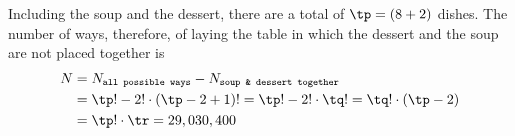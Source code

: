 
\watchout

\ifprintanswers
\fi 

\begin{solution}[\mcq]
  Including the soup and the dessert, there are a total of $\tp = (\vbone + 2)$ dishes. The number of ways, therefore, 
  of laying the table in which the dessert and the soup are not placed together is 
  \begin{align}
  	N &= N_{\texttt{all possible ways}} - N_{\texttt{soup \& dessert together}} \\
  	  &= \tp ! - 2!\cdot\left( \tp - 2 + 1\right) ! = \tp ! - 2!\cdot\tq ! = \tq !\cdot(\tp - 2) \\
  	  &= \tp!\cdot\tr = \vbtwo
  \end{align}
\end{solution}
